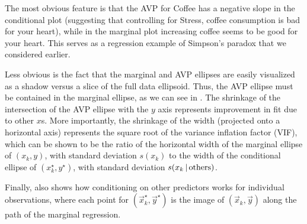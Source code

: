 The most obvious feature is that the AVP for Coffee has a negative slope in the conditional
plot (suggesting that controlling for Stress, coffee consumption is bad for your heart), while
in the marginal plot increasing coffee seems to be good for your heart. This serves as a
regression example of Simpson's paradox that we considered earlier.

Less obvious is the fact that 
the marginal and AVP ellipses are easily visualized as a shadow versus a slice of the full data ellipsoid. 
Thus, the AVP ellipse must be contained in the marginal ellipse, as we can see in .
The shrinkage of the intersection of the AVP ellipse with the $y$ axis represents improvement in fit due to other $x$s.
More importantly, the shrinkage of the width (projected onto a horizontal axis) represents the 
square root of the variance inflation factor (VIF), which can be shown to be the ratio of the horizontal
width of the marginal ellipse of $(x_k, y)$, with standard deviation $s(x_k)$ to the width of the conditional
ellipse of $(x_k^\star, y^\star)$, with standard deviation $s(x_k \, | \, \textrm{others})$.

Finally,  also shows how conditioning on other predictors works for individual
observations, where each point for  $(\vec{x}_k^\star, \vec{y}^\star)$ is the image of $(\vec{x}_k, \vec{y})$ 
along the path of the marginal regression.

